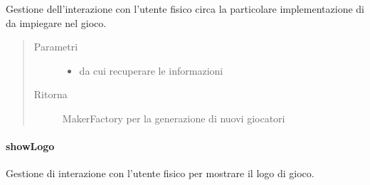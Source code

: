 \documentclass[letterpaper,10pt,italian,openany,oneside]{sphinxmanual}
\begin{document}
\begin{fulllineitems}
\label{\detokenize{test/it/unicam/cs/pa/mastermind/ui/StartView:it.unicam.cs.pa.mastermind.ui.StartView.setupMaker(MakerFactoryRegistry)}}
Gestione dell’interazione con l’utente fisico circa la particolare implementazione di  da impiegare nel gioco.
\begin{quote}\begin{description}
\item[{Parametri}] \leavevmode\begin{itemize}
\item {} 
 \textendash{} da cui recuperare le informazioni

\end{itemize}

\item[{Ritorna}] \leavevmode
MakerFactory per la generazione di nuovi giocatori 

\end{description}\end{quote}

\end{fulllineitems}



\paragraph{showLogo}
\label{\detokenize{test/it/unicam/cs/pa/mastermind/ui/StartView:showlogo}}

\begin{fulllineitems}
\label{\detokenize{test/it/unicam/cs/pa/mastermind/ui/StartView:it.unicam.cs.pa.mastermind.ui.StartView.showLogo()}}
Gestione di interazione con l’utente fisico per mostrare il logo di gioco.

\end{fulllineitems}
\end{document}
